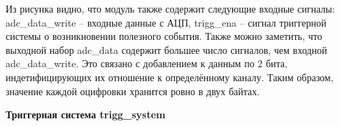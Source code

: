 Из рисунка видно, что модуль также содержит следующие входные сигналы: adc\_data\_write -- входные данные с АЦП, trigg\_ena -- сигнал триггерной системы о возникновении полезного события. Также можно заметить, что выходной набор adc\_data содержит большее число сигналов, чем входной adc\_data\_write. Это связано с добавлением к данным по 2 бита, индетифицирующих их отношение к определённому каналу. Таким образом, значение каждой оцифровки хранится ровно в двух байтах.\par
\textbf{Триггерная система trigg\_system}\par
